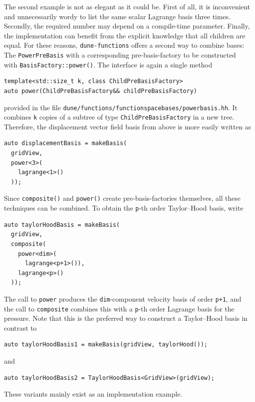 \documentclass[a4paper,10pt,headings=normal,bibliography=totoc]{scrartcl}
\newcommand{\cpp}[1]{\lstinline[basicstyle=\ttfamily]!#1!}
\newcommand{\dunemodule}[1]{\texttt{#1}}
\newcommand{\file}[1]{\texttt{#1}}
\begin{document}
The second example is not as elegant as it could be.  First of all, it is inconvenient and unnecessarily
wordy to list the same scalar Lagrange basis three times.  Secondly, the required number may depend on
a compile-time parameter.
Finally, the implementation can benefit from the explicit knowledge that
all children are equal.
For these reasons, \dunemodule{dune-functions}
offers a second way to combine bases: The \cpp{PowerPreBasis} with a
corresponding pre-basis-factory to be constructed with \cpp{BasisFactory::power()}.
The interface is again a single method
\begin{lstlisting}[style=Interface]
template<std::size_t k, class ChildPreBasisFactory>
auto power(ChildPreBasisFactory&& childPreBasisFactory)
\end{lstlisting}
provided in the file \file{dune/functions/functionspacebases/powerbasis.hh}.
It combines \cpp{k} copies of a subtree of type \cpp{ChildPreBasisFactory} in a new tree.  Therefore, the
displacement vector field basis from above is more easily written as
\begin{lstlisting}[style=Example]
auto displacementBasis = makeBasis(
  gridView,
  power<3>(
    lagrange<1>()
  ));
\end{lstlisting}
Since \cpp{composite()} and \cpp{power()} create pre-basis-factories themselves,
all these techniques can be combined. To obtain the \cpp{p}-th order Taylor--Hood basis,
write
\begin{lstlisting}[style=Example]
auto taylorHoodBasis = makeBasis(
  gridView,
  composite(
    power<dim>(
      lagrange<p+1>()),
    lagrange<p>()
  ));
\end{lstlisting}
The call to \cpp{power} produces the \cpp{dim}-component velocity basis of order \cpp{p+1},
and the call to \cpp{composite} combines this with a \cpp{p}-th order Lagrange basis for the pressure.
Note that this is the preferred way to construct a Taylor--Hood basis in contrast to
\begin{lstlisting}[style=Example]
auto taylorHoodBasis1 = makeBasis(gridView, taylorHood());
\end{lstlisting}
and
\begin{lstlisting}[style=Example]
auto taylorHoodBasis2 = TaylorHoodBasis<GridView>(gridView);
\end{lstlisting}
These variants mainly exist as an implementation example.
\end{document}
